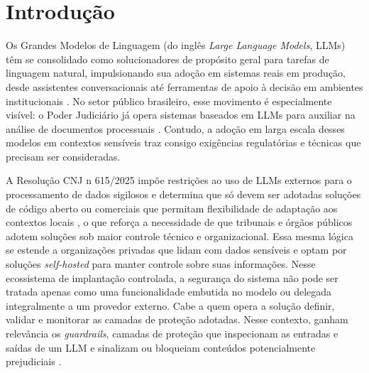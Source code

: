 \chapter{Introdução}
\label{cap:introducao}

Os Grandes Modelos de Linguagem (do inglês \textit{Large Language Models}, LLMs) têm se consolidado como solucionadores de propósito geral para tarefas de linguagem natural, impulsionando sua adoção em sistemas reais em produção, desde assistentes conversacionais até ferramentas de apoio à decisão em ambientes institucionais \cite{zhao2023survey}. No setor público brasileiro, esse movimento é especialmente visível: o Poder Judiciário já opera sistemas baseados em LLMs para auxiliar na análise de documentos processuais \cite{trt4galileu2026}. Contudo, a adoção em larga escala desses modelos em contextos sensíveis traz consigo exigências regulatórias e técnicas que precisam ser consideradas.

A Resolução CNJ n\textordmasculine{} 615/2025 impõe restrições ao uso de LLMs externos para o processamento de dados sigilosos e determina que só devem ser adotadas soluções de código aberto ou comerciais que permitam flexibilidade de adaptação aos contextos locais \cite{cnj615}, o que reforça a necessidade de que tribunais e órgãos públicos adotem soluções sob maior controle técnico e organizacional. Essa mesma lógica se estende a organizações privadas que lidam com dados sensíveis e optam por soluções \textit{self-hosted} para manter controle sobre suas informações. Nesse ecossistema de implantação controlada, a segurança do sistema não pode ser tratada apenas como uma funcionalidade embutida no modelo ou delegada integralmente a um provedor externo. Cabe a quem opera a solução definir, validar e monitorar as camadas de proteção adotadas. Nesse contexto, ganham relevância os \textit{guardrails}, camadas de proteção que inspecionam as entradas e saídas de um LLM e sinalizam ou bloqueiam conteúdos potencialmente prejudiciais \cite{kumar2025freelunchguardrails}.

